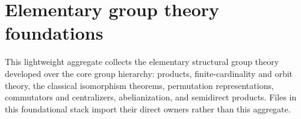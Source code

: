 \section{Elementary group theory foundations}















This lightweight aggregate collects the elementary structural group theory
developed over the core group hierarchy: products, finite-cardinality and
orbit theory, the classical isomorphism theorems, permutation
representations, commutators and centralizers, abelianization, and semidirect
products.
Files in this foundational stack import their direct owners rather than this
aggregate.
